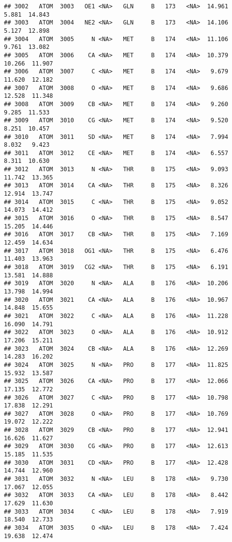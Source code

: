 \documentclass[
]{article}
\begin{document}
\begin{verbatim}
## 3002   ATOM  3003   OE1 <NA>   GLN     B   173   <NA>  14.961   5.881  14.843
## 3003   ATOM  3004   NE2 <NA>   GLN     B   173   <NA>  14.106   5.127  12.898
## 3004   ATOM  3005     N <NA>   MET     B   174   <NA>  11.106   9.761  13.082
## 3005   ATOM  3006    CA <NA>   MET     B   174   <NA>  10.379  10.266  11.907
## 3006   ATOM  3007     C <NA>   MET     B   174   <NA>   9.679  11.620  12.182
## 3007   ATOM  3008     O <NA>   MET     B   174   <NA>   9.686  12.528  11.348
## 3008   ATOM  3009    CB <NA>   MET     B   174   <NA>   9.260   9.285  11.533
## 3009   ATOM  3010    CG <NA>   MET     B   174   <NA>   9.520   8.251  10.457
## 3010   ATOM  3011    SD <NA>   MET     B   174   <NA>   7.994   8.032   9.423
## 3011   ATOM  3012    CE <NA>   MET     B   174   <NA>   6.557   8.311  10.630
## 3012   ATOM  3013     N <NA>   THR     B   175   <NA>   9.093  11.742  13.365
## 3013   ATOM  3014    CA <NA>   THR     B   175   <NA>   8.326  12.914  13.747
## 3014   ATOM  3015     C <NA>   THR     B   175   <NA>   9.052  14.073  14.412
## 3015   ATOM  3016     O <NA>   THR     B   175   <NA>   8.547  15.205  14.446
## 3016   ATOM  3017    CB <NA>   THR     B   175   <NA>   7.169  12.459  14.634
## 3017   ATOM  3018   OG1 <NA>   THR     B   175   <NA>   6.476  11.403  13.963
## 3018   ATOM  3019   CG2 <NA>   THR     B   175   <NA>   6.191  13.581  14.888
## 3019   ATOM  3020     N <NA>   ALA     B   176   <NA>  10.206  13.798  14.994
## 3020   ATOM  3021    CA <NA>   ALA     B   176   <NA>  10.967  14.848  15.655
## 3021   ATOM  3022     C <NA>   ALA     B   176   <NA>  11.228  16.090  14.791
## 3022   ATOM  3023     O <NA>   ALA     B   176   <NA>  10.912  17.206  15.211
## 3023   ATOM  3024    CB <NA>   ALA     B   176   <NA>  12.269  14.283  16.202
## 3024   ATOM  3025     N <NA>   PRO     B   177   <NA>  11.825  15.932  13.587
## 3025   ATOM  3026    CA <NA>   PRO     B   177   <NA>  12.066  17.135  12.772
## 3026   ATOM  3027     C <NA>   PRO     B   177   <NA>  10.798  17.838  12.291
## 3027   ATOM  3028     O <NA>   PRO     B   177   <NA>  10.769  19.072  12.222
## 3028   ATOM  3029    CB <NA>   PRO     B   177   <NA>  12.941  16.626  11.627
## 3029   ATOM  3030    CG <NA>   PRO     B   177   <NA>  12.613  15.185  11.535
## 3030   ATOM  3031    CD <NA>   PRO     B   177   <NA>  12.428  14.744  12.960
## 3031   ATOM  3032     N <NA>   LEU     B   178   <NA>   9.730  17.067  12.055
## 3032   ATOM  3033    CA <NA>   LEU     B   178   <NA>   8.442  17.629  11.630
## 3033   ATOM  3034     C <NA>   LEU     B   178   <NA>   7.919  18.540  12.733
## 3034   ATOM  3035     O <NA>   LEU     B   178   <NA>   7.424  19.638  12.474

\end{verbatim}
\end{document}
